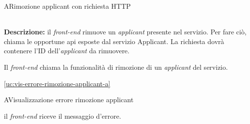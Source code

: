 \begin{usecase}{13}{A}{Rimozione applicant con richiesta HTTP}


	\textbf{\\Descrizione:} il \textit{front-end} rimuove un \textit{applicant} presente nel servizio. Per fare ciò,
	chiama le opportune \acrshort{api} esposte dal servizio Applicant. La richiesta dovrà contenere l'ID dell'\textit{applicant} da rimuovere.

	\begin{ucscenarioprincipale}
		\item Il \textit{front-end} chiama la funzionalità di rimozione di un \textit{applicant} del servizio.
	\end{ucscenarioprincipale}


	\begin{ucestensioni}
		\item \ref{uc:vis-errore-rimozione-applicant-a}
	\end{ucestensioni}

	\label{uc:richiesta-rimozione-applicant-a}
\end{usecase}

\begin{usecase}{14}{A}{Visualizzazione errore rimozione applicant}



	\begin{ucscenarioprincipale}
		\item il \textit{front-end} riceve il messaggio d'errore.
	\end{ucscenarioprincipale}


	\label{uc:vis-errore-rimozione-applicant-a}
\end{usecase}




